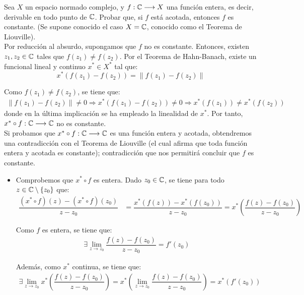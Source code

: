 \begin{ejercicio}
    Sea $X$ un espacio normado complejo, y $f: \mathbb{C} \longrightarrow X$ una función entera, es decir, derivable en todo punto de $\mathbb{C}$. Probar que, si $f$ está acotada, entonces $f$ es constante. (Se supone conocido el caso $X = \mathbb{C}$, conocido como el Teorema de Liouville).\\

    Por reducción al absurdo, supongamos que $f$ no es constante. Entonces, existen $z_1, z_2 \in \mathbb{C}$ tales que $f(z_1) \neq f(z_2)$. Por el Teorema de Hahn-Banach, existe un funcional lineal y continuo $x^* \in X^*$ tal que:
    \[
        x^*(f(z_1) - f(z_2)) = \|f(z_1) - f(z_2)\|
    \]

    Como $f(z_1) \neq f(z_2)$, se tiene que:
    \begin{align*}
        \|f(z_1) - f(z_2)\| \neq 0\Longrightarrow
        x^*(f(z_1) - f(z_2)) \neq 0\Longrightarrow
        x^*(f(z_1)) \neq x^*(f(z_2))
    \end{align*}
    donde en la última implicación se ha empleado la linealidad de $x^*$. Por tanto, $x^* \circ f: \mathbb{C} \longrightarrow \mathbb{C}$ no es constante.\\
    
    Si probamos que $x^* \circ f: \mathbb{C} \longrightarrow \mathbb{C}$ es una función entera y acotada, obtendremos una contradicción con el Teorema de Liouville (el cual afirma que toda función entera y acotada es constante); contradicción que nos permitirá concluir que $f$ es constante.
    \begin{itemize}
        \item Comprobemos que $x^* \circ f$ es entera. Dado $z_0 \in \mathbb{C}$, se tiene para todo $z \in \mathbb{C}\setminus \{z_0\}$ que:
        \begin{align*}
            \dfrac{(x^* \circ f)(z) - (x^* \circ f)(z_0)}{z - z_0} &= \dfrac{x^*(f(z)) - x^*(f(z_0))}{z - z_0} = x^*\left(\dfrac{f(z) - f(z_0)}{z - z_0}\right)
        \end{align*}

        Como $f$ es entera, se tiene que:
        \begin{align*}
            \exists \lim_{z \to z_0} \dfrac{f(z) - f(z_0)}{z - z_0} = f'(z_0)
        \end{align*}

        Además, como $x^*$ continua, se tiene que:
        \begin{align*}
            \exists \lim_{z \to z_0} x^*\left(\dfrac{f(z) - f(z_0)}{z - z_0}\right) = x^*\left(\lim_{z \to z_0} \dfrac{f(z) - f(z_0)}{z - z_0}\right) = x^*(f'(z_0))
        \end{align*}


\end{itemize}
\end{ejercicio}
